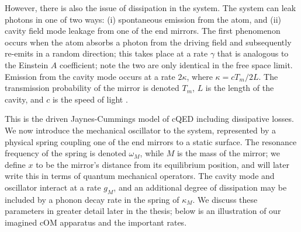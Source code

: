 However, there is also the issue of dissipation in the system. The system can leak photons in one of two ways: (i) spontaneous emission from the atom, and (ii) cavity field mode leakage from one of the end mirrors. The first phenomenon occurs when the atom absorbs a photon from the driving field and subsequently re-emits in a random direction; this takes place at a rate $\gamma$ that is analogous to the Einstein $A$ coefficient; note the two are only identical in the free space limit. Emission from the cavity mode occurs at a rate $2\kappa$, where $\kappa = cT_m/2L$. The transmission probability of the mirror is denoted $T_m$, $L$ is the length of the cavity, and $c$ is the speed of light \cite{charliethesis}.

This is the driven Jaynes-Cummings model of cQED including dissipative losses. We now introduce the mechanical oscillator to the system, represented by a physical spring coupling one of the end mirrors to a static surface. The resonance frequency of the spring is denoted $\omega_M$, while $M$ is the mass of the mirror; we define $x$ to be the mirror's distance from its equilibrium position, and will later write this in terms of quantum mechanical operators. The cavity mode and oscillator interact at a rate $g_M$, and an additional degree of dissipation may be included by a phonon decay rate in the spring of $\kappa_M$. We discuss these parameters in greater detail later in the thesis; below is an illustration \cite{kippenberg2007} of our imagined cOM apparatus and the important rates.


